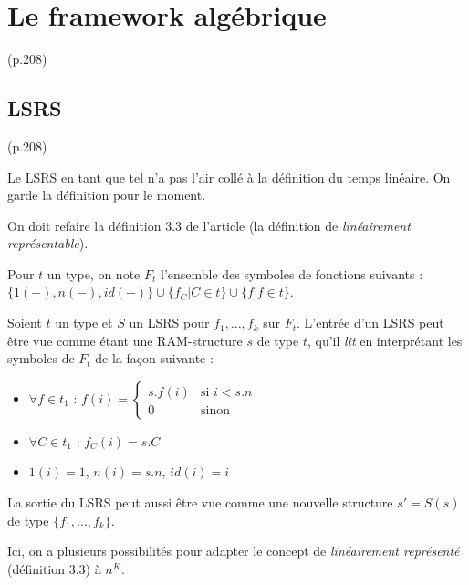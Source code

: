 \documentclass{article}
\begin{document}
	\section{Le framework algébrique} (p.208)
		\label{sec:framework_algebrique}

		\subsection{LSRS} (p.208)
			\label{subsec:LSRS}
		
		Le LSRS en tant que tel n'a pas l'air collé à la définition du temps linéaire. On garde la définition pour le moment.
		
		
		
		
		On doit refaire la définition 3.3 de l'article (la définition de \emph{linéairement représentable}).
		
		Pour $t$ un type, on note $F_t$ l'ensemble des symboles de fonctions suivants : $\{1(-), n(-), id(-)\} \cup  \{ f_C | C \in t\} \cup \{ f | f \in t\}$.
		
		\begin{remark}
			\label{rk:entree_LSRS}
			Soient $t$ un type et $S$ un LSRS pour $f_1, \dots, f_k$ sur $F_{t}$. 
			L'entrée d'un LSRS peut être vue comme étant une RAM-structure $s$ de type $t$, qu'il \emph{lit} en interprétant les symboles de $F_t$ de la façon suivante : 
			
			\begin{itemize}[itemsep=-1mm]
				\item 	$\forall f \in t_1$ :   $f(i) = 
				\left\lbrace \begin{array}{ll}
				s.f(i) & \text{si } i< s.n \\
				0 & \text{sinon}
				\end{array}\right.$
				
				\item 	$\forall C \in t_1$ :   $f_C(i) = s.C$
				\item 	$1(i) = 1$, $n(i) = s.n$, $id(i) = i$
			\end{itemize}
			
			La sortie du LSRS peut aussi être vue comme une nouvelle structure $s' = S(s)$ de type $\{f_1, \dots, f_k\}$.
		\end{remark}
		
		
		Ici, on a plusieurs possibilités pour adapter le concept de \emph{linéairement représenté} (définition 3.3) à $n^K$.
		
\end{document}

